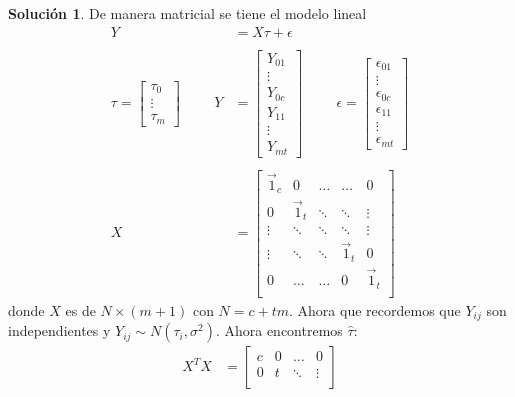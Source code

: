 \documentclass[12pt]{article}
\theoremstyle{plain}
\theoremstyle{definition}
\theoremstyle{definition}
\theoremstyle{definition}
\newtheorem*{solution}{Solución}
\begin{document}
\begin{solution}
De manera matricial se tiene el modelo lineal 
\begin{align*}
    Y &= X \tau + \epsilon \\
    \\
    \tau = \begin{bmatrix}
        \tau_0 \\ \vdots \\ \tau_m
    \end{bmatrix}\hspace{1cm} Y &= \begin{bmatrix}
        Y_{01} \\  \vdots \\ Y_{0c} \\ Y_{11} \\ \vdots \\ Y_{mt}
    \end{bmatrix} \hspace{1cm} \epsilon = \begin{bmatrix}
        \epsilon_{01} \\  \vdots \\ \epsilon_{0c} \\ \epsilon_{11} \\ \vdots \\ \epsilon_{mt}
    \end{bmatrix}  \\ \\
    X &= \begin{bmatrix}
        \Vec{1}_{c} & 0 & \ldots & \ldots & 0   \\
        0 & \Vec{1}_{t} & \ddots & \ddots & \vdots  \\
        \vdots & \ddots  & \ddots & \ddots & \vdots \\
        \vdots & \ddots  & \ddots & \Vec{1}_{t} & 0 \\
        0 & \ldots  & \ldots & 0 & \Vec{1}_{t} \\
     \end{bmatrix}
\end{align*}
donde $X$ es de $N \times (m+1)$ con $N = c + tm$. Ahora que recordemos que $Y_{ij}$ son independientes y $Y_{ij} \sim  N( \tau_i , \sigma^2 )$. Ahora encontremos $\hat \tau$: 
\begin{align*}
    X^T X &= \begin{bmatrix}
        c & 0 & \ldots & 0 \\
        0 & t & \ddots & \vdots \\

\end{bmatrix}
\end{align*}
\end{solution}
\end{document}
